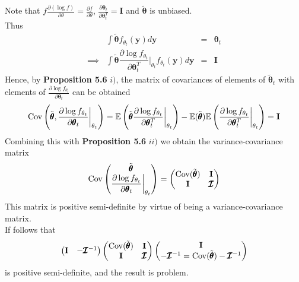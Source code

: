 \documentclass[11pt,a4paper]{article}
\begin{document}
Note that $f\frac{\partial(\log f)}{\partial\theta}=\frac{\partial f}{\partial\theta}$, $\frac{\partial\pmb\theta_t}{\partial\pmb\theta_t^T}=\textbf{I}$ and $\tilde{\pmb\theta}$ is unbiased.\\
Thus
\[\begin{array}{rrcl}
&\displaystyle\int\tilde{\pmb\theta}f_{\theta_t}(\textbf{y})d\textbf{y}&=&\pmb\theta_t\\
\implies&\displaystyle\int\tilde{\pmb\theta}\dfrac{\partial\log f_{\theta_t}}{\partial\pmb\theta_t^T}\bigg|_{\theta_t}f_{\theta_t}(\textbf{y})d\textbf{y}&=&\textbf{I}
\end{array}\]
Hence, by \textbf{Proposition 5.6} $i)$, the matrix of covariances of elements of $\tilde{\pmb\theta}_t$ with elements of $\frac{\partial\log f_{\theta_t}}{\partial\pmb\theta_t}$ can be obtained 
$$\mathrm{Cov}\left(\tilde{\pmb\theta},\frac{\partial\log f_{\theta_t}}{\partial\pmb\theta_t}\bigg|_{\theta_t}\right)=\mathbb{E}\left(\tilde{\pmb\theta}\dfrac{\partial\log f_{\theta_t}}{\partial\pmb\theta_t^T}\bigg|_{\theta_t}\right)-\mathbb{E}(\tilde{\pmb\theta})\mathbb{E}\left(\dfrac{\partial\log f_{\theta_t}}{\partial\pmb\theta_t^T}\bigg|_{\theta_t}\right)=\textbf{I}$$
Combining this with \textbf{Proposition 5.6} $ii)$ we obtain the variance-covariance matrix
$$\mathrm{Cov}\begin{pmatrix}\tilde{\pmb\theta}\\\dfrac{\partial\log f_{\theta_t}}{\partial\pmb\theta_t}\bigg|_{\theta_t}\end{pmatrix}=\begin{pmatrix}\mathrm{Cov}(\tilde{\pmb\theta})&\textbf{I}\\\textbf{I}&\pmb{\mathcal{I}}\end{pmatrix}$$
This matrix is positive semi-definite by virtue of being a variance-covariance matrix.\\
If follows that
$$\begin{pmatrix}\textbf{I}&-\pmb{\mathcal{I}}^{-1}\end{pmatrix}\begin{pmatrix}\mathrm{Cov}(\tilde{\pmb\theta})&\textbf{I}\\\textbf{I}&\pmb{\mathcal{I}}\end{pmatrix}\begin{pmatrix}\textbf{I}\\-\pmb{\mathcal{I}}^{-1}=\mathrm{Cov}(\tilde{\pmb\theta})-\pmb{\mathcal{I}}^{-1}\end{pmatrix}$$
is positive semi-definite, and the result is problem.\\
\end{document}
